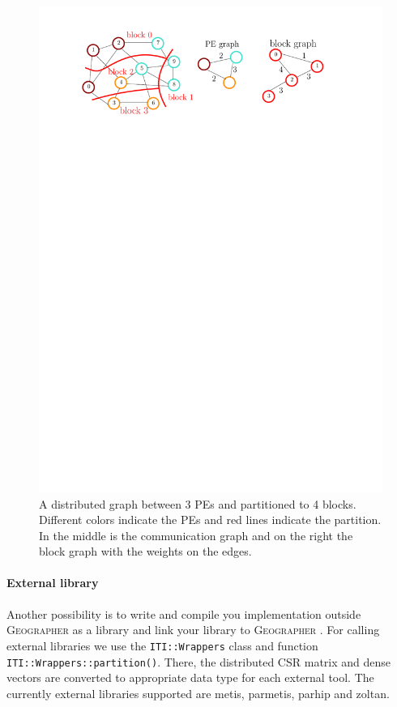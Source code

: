\documentclass[a4paper,10pt]{article}
\newcommand{\geo}{\textsc{Geographer} }
\newcommand{\MI}[1]{\texttt{#1}}
\begin{document}
\begin{figure}[h]
\centering
\includegraphics[scale=0.9]{graph_partitioned_with_PE_block_graph}
\caption{A distributed graph between 3 PEs and partitioned to 4 blocks. Different colors indicate the PEs
and red lines indicate the partition. In the middle is the communication graph and on the right the
block graph with the weights on the edges.}
\label{fig:part_graph}
\end{figure}


\paragraph*{External library}
Another possibility is to write and compile you implementation outside \geo as a library and link
your library to \geo. For calling external libraries we use the \MI{ITI::Wrappers} class and function
\MI{ITI::Wrappers::partition()}. There, the distributed CSR matrix and dense vectors are converted
to appropriate data type for each external tool. The currently external libraries supported are
metis, parmetis, parhip and zoltan.
\end{document}
